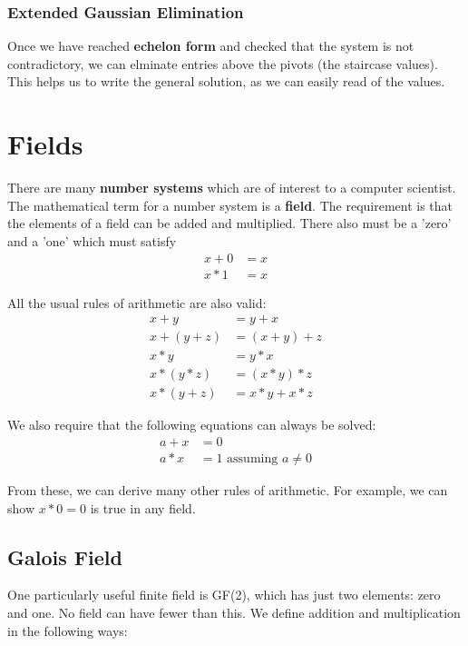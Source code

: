 \documentclass{article}
\begin{document}
	\subsubsection{Extended Gaussian Elimination}
	Once we have reached \textbf{echelon form} and checked that the system is not contradictory, we can elminate entries above the pivots (the staircase values). This helps us to write the general solution, as we can easily read of the values.
	
	\section{Fields}
	There are many \textbf{number systems} which are of interest to a computer scientist. The mathematical term for a number system is a \textbf{field}. The requirement is that the elements of a field can be added and multiplied. There also must be a 'zero' and a 'one' which must satisfy
	\begin{align*}
		x + 0 &= x \\
		x * 1 &= x
	\end{align*}
	
	All the usual rules of arithmetic are also valid:
	\begin{align*}
		x + y &= y + x \\
		x + (y + z) &= (x + y) + z \\
		x * y &= y * x \\
		x * (y * z) &= (x * y) * z \\
		x * (y + z) &= x*y + x*z
	\end{align*}
	
	We also require that the following equations can always be solved:
	\begin{align*}
		a + x &= 0 \\
		a * x &= 1 \text{ assuming } a \neq	0
	\end{align*}
	
	From these, we can derive many other rules of arithmetic. For example, we can show $x * 0 = 0$ is true in any field.
	
	\subsection{Galois Field}
	One particularly useful finite field is GF(2), which has just two elements: zero and one. No field can have fewer than this. We define addition and multiplication in the following ways:
	
\end{document}
